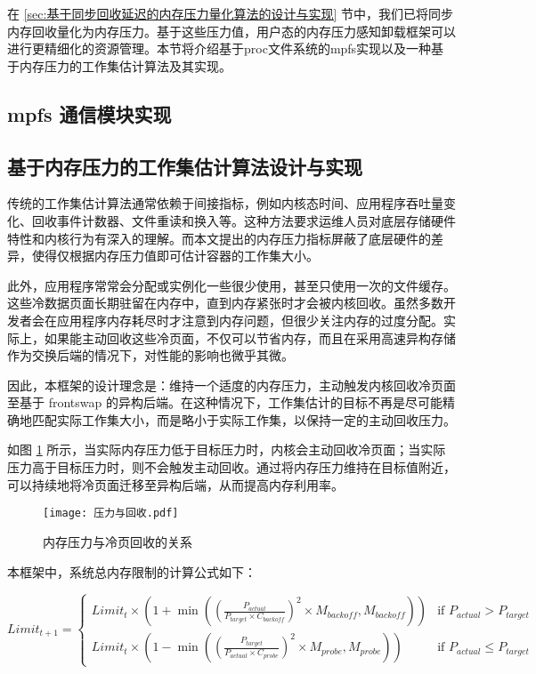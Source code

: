 在 \ref{sec:基于同步回收延迟的内存压力量化算法的设计与实现} 节中，我们已将同步内存回收量化为内存压力。基于这些压力值，用户态的内存压力感知卸载框架可以进行更精细化的资源管理。本节将介绍基于proc文件系统的mpfs实现以及一种基于内存压力的工作集估计算法及其实现。


\subsection{mpfs 通信模块实现}




\subsection{基于内存压力的工作集估计算法设计与实现}

传统的工作集估计算法通常依赖于间接指标，例如内核态时间、应用程序吞吐量变化、回收事件计数器、文件重读和换入等。这种方法要求运维人员对底层存储硬件特性和内核行为有深入的理解。而本文提出的内存压力指标屏蔽了底层硬件的差异，使得仅根据内存压力值即可估计容器的工作集大小。

此外，应用程序常常会分配或实例化一些很少使用，甚至只使用一次的文件缓存。这些冷数据页面长期驻留在内存中，直到内存紧张时才会被内核回收。虽然多数开发者会在应用程序内存耗尽时才注意到内存问题，但很少关注内存的过度分配。实际上，如果能主动回收这些冷页面，不仅可以节省内存，而且在采用高速异构存储作为交换后端的情况下，对性能的影响也微乎其微。

因此，本框架的设计理念是：维持一个适度的内存压力，主动触发内核回收冷页面至基于 frontswap 的异构后端。在这种情况下，工作集估计的目标不再是尽可能精确地匹配实际工作集大小，而是略小于实际工作集，以保持一定的主动回收压力。

如图 \ref{fig:pressure_work_set} 所示，当实际内存压力低于目标压力时，内核会主动回收冷页面；当实际压力高于目标压力时，则不会触发主动回收。通过将内存压力维持在目标值附近，可以持续地将冷页面迁移至异构后端，从而提高内存利用率。

\begin{figure}[H]
\centering
\texttt{[image: 压力与回收.pdf]}
\caption{内存压力与冷页回收的关系}
\label{fig:pressure_work_set}
\end{figure}

本框架中，系统总内存限制的计算公式如下：

\begin{equation}
    \label{eq:limit_adjust}
    Limit_{t+1} = 
    \begin{cases}
    Limit_t \times \left(1 + \min\left(\left(\frac{P_{actual}}{P_{target} \times C_{backoff}}\right)^2 \times M_{backoff}, M_{backoff}\right)\right) & \text{if } P_{actual} > P_{target} \\
    Limit_t \times \left(1 - \min\left(\left(\frac{P_{target}}{P_{actual} \times C_{probe}}\right)^2 \times M_{probe}, M_{probe}\right)\right) & \text{if } P_{actual} \leq P_{target}
    \end{cases}
    \end{equation}

